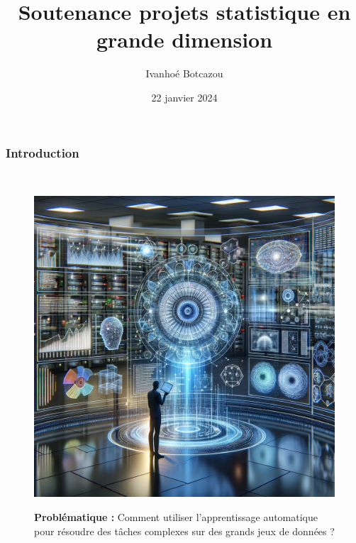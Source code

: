 \documentclass{beamer}
\title{Soutenance projets statistique en grande dimension }
\author{Ivanhoé Botcazou}
\date{22 janvier 2024}
\theoremstyle{definition}
\begin{document}
\begin{frame}[plain]
    \maketitle
\end{frame}


\begin{frame}
\frametitle{Introduction}
\hfill\\[-0.75cm]
\begin{figure}
	\centering
	\includegraphics[width=0.55\linewidth]{1.png}\\[0.25cm]
	\raggedright
	\textcolor{modernmarron}{\textbf{Problématique :}} Comment utiliser l’apprentissage automatique pour résoudre des tâches complexes sur des grands jeux de données ?  
	
\end{figure}
\end{frame}

\begin{frame}
	\tableofcontents
\end{frame}
\end{document}
